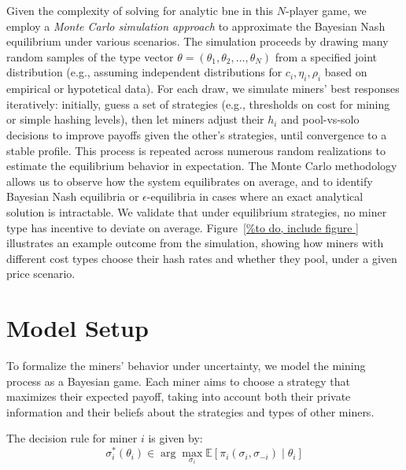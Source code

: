 \documentclass[12pt]{article}
\begin{document}
Given the complexity of solving for analytic \gls{bne} in this $N$-player game, we employ a \emph{Monte Carlo simulation approach} to approximate the Bayesian Nash equilibrium under various scenarios. The simulation proceeds by drawing many random samples of the type vector $\theta = (\theta_1, \theta_2, \dots, \theta_N)$ from a specified joint distribution (e.g., assuming independent distributions for $c_i, \eta_i, \rho_i$ based on empirical or hypotetical data). For each draw, we simulate miners' best responses iteratively: initially, guess a set of strategies (e.g., thresholds on cost for mining or simple hashing levels), then let miners adjust their $h_i$ and pool-vs-solo decisions to improve payoffs given the other's strategies, until convergence to a stable profile. This process is repeated across numerous random realizations to estimate the equilibrium behavior in expectation. The Monte Carlo methodology allows us to observe how the system equilibrates on average, and to identify Bayesian Nash equilibria or $\epsilon$-equilibria in cases where an exact analytical solution is intractable. We validate that under equilibrium strategies, no miner type has incentive to deviate on average. Figure~\ref{%
} illustrates an example outcome from the simulation, showing how miners with different cost types choose their hash rates and whether they pool, under a given price scenario.


\section{Model Setup}
To formalize the miners' behavior under uncertainty, we model the mining process as a Bayesian game. Each miner aims to choose a strategy that maximizes their expected payoff, taking into account both their private information and their beliefs about the strategies and types of other miners.

The decision rule for miner $i$ is given by:
\begin{equation}
	\sigma_i^*(\theta_i) \in \arg\max_{\sigma_i} \mathbb{E}\left[\pi_i(\sigma_i, \sigma_{-i}) \mid \theta_i\right]
\end{equation}
\end{document}
